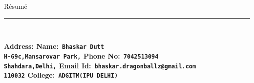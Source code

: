 \documentclass[10pt]{report}
\begin{document}
	
{\huge\hspace{210pt}R\'{e}sum\'{e}}
\\{\noindent\rule{18cm}{0.8pt}\\[4pt]}
\bf Address: \hspace{258pt}\bf Name:\verb| Bhaskar Dutt|
\\
\verb"H-69c,Mansarovar Park,"  \hspace{188pt}\bf Phone No:\verb" 7042513094"
\\{\verb"Shahdara,Delhi,"}   \hspace{226pt}\bf Email Id:\verb" bhaskar.dragonballz@gmail.com"
\\{\verb"110032"}    \hspace{272pt}\bf College:\verb" ADGITM(IPU DELHI)" \\[1pt]
\end{document}
